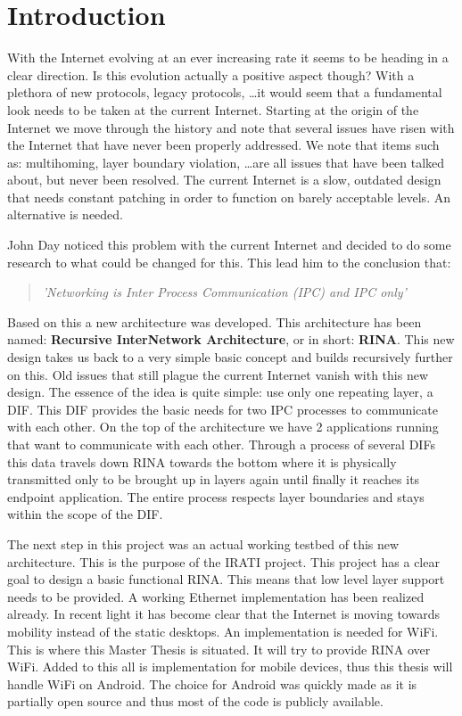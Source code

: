 \chapter{Introduction}

With the Internet evolving at an ever increasing rate it seems to be heading in a clear direction. Is this evolution actually a positive aspect though? With a plethora of new protocols, legacy protocols, \ldots it would seem that a fundamental look needs to be taken at the current Internet. Starting at the origin of the Internet we move through the history and note that several issues have risen with the Internet that have never been properly addressed. We note that items such as: multihoming, layer boundary violation, \ldots are all issues that have been talked about, but never been resolved. The current Internet is a slow, outdated design that needs constant patching in order to function on barely acceptable levels. An alternative is needed. 

\npar

John Day noticed this problem with the current Internet and decided to do some research to what could be changed for this. This lead him to the conclusion that:

\begin{quote}
	\emph{'Networking is Inter Process Communication (IPC) and IPC only' \citep{johnday2008}}
\end{quote}

Based on this a new architecture was developed. This architecture has been named: \textbf{Recursive InterNetwork Architecture}, or in short: \textbf{RINA}. This new design takes us back to a very simple basic concept and builds recursively further on this. Old issues that still plague the current Internet vanish with this new design. The essence of the idea is quite simple: use only one repeating layer, a DIF. This DIF provides the basic needs for two IPC processes to communicate with each other. On the top of the architecture we have 2 applications running that want to communicate with each other. Through a process of several DIFs this data travels down RINA towards the bottom where it is physically transmitted only to be brought up in layers again until finally it reaches its endpoint application. The entire process respects layer boundaries and stays within the scope of the DIF.

\npar

The next step in this project was an actual working testbed of this new architecture. This is the purpose of the IRATI project. This project has a clear goal to design a basic functional RINA. This means that low level layer support needs to be provided. A working Ethernet implementation has been realized already. In recent light it has become clear that the Internet is moving towards mobility instead of the static desktops. An implementation is needed for WiFi. This is where this Master Thesis is situated. It will try to provide RINA over WiFi. Added to this all is implementation for mobile devices, thus this thesis will handle WiFi on Android. The choice for Android was quickly made as it is partially open source and thus most of the code is publicly available.

